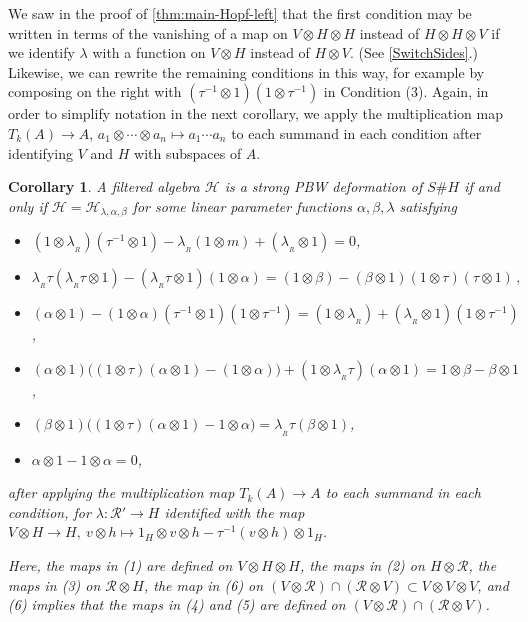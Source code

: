 \documentclass[11pt]{amsart}
\numberwithin{equation}{section}
\newtheorem{cor}[equation]{Corollary}
\newcommand{\chabl}{\cH_{\lambda,\alpha,\beta}}
\newcommand{\R}{\mathcal{R}}
\newcommand{\itau}{{\tau^{-1}}}%
\renewcommand{\_}[1]{\mbox{$_{\left( #1 \right)}$}}
\newcommand{\ot}{\otimes}
\newcommand{\Ho}{H}%
\newcommand{\cH}{\mathcal{H}}
\begin{document}
{\vspace{3ex}

We saw in the proof of \cref{thm:main-Hopf-left}
that 
  the first condition may be written in terms of the vanishing of a map on
  $V\ot H\ot H$ instead of $H\ot H\ot V$ if we identify $\lambda$
  with a function on $V\ot H$ instead of $H\ot V$.
  (See \cref{SwitchSides}.) 
  Likewise, we can rewrite the remaining
  conditions in this way, for example 
  by composing on the right with $(\itau \ot 1)(1\ot \itau)$ in
  Condition (3).  
Again, in order to simplify notation in the next corollary,
we apply the multiplication map $T_k(A)\rightarrow A$,
$a_1\ot\cdots\ot a_n\mapsto a_1\cdots  a_n$
to each summand in each condition after identifying $V$ and $H$ with
subspaces of $A$.

\vspace{1ex}

\begin{cor}    %
\label{thm:main-Hopf-right}
A filtered algebra $\cH$ is a strong PBW deformation of $S\# \Ho$ if
and only if $\cH=\chabl$ for some linear parameter functions
$\alpha,\beta,\lambda$ satisfying
\begin{itemize}
  \item[$(1)$] $(1\ot \lambda_{_R})(\itau\ot 1) - \lambda_{_R} (1\ot m) +
    (\lambda_{_R}\ot 1) = 0$,
   \item[$(2)$]
    $
  \lambda_{_R}\tau (\lambda_{_R}\tau\ot 1) 
-   (\lambda_{_R}\tau \ot 1) (1\ot \alpha)
=
(1\ot \beta)- (\beta\ot 1) (1\ot \tau)(\tau\ot 1)
\, , 
$
  \item[$(3)$] $(\alpha\ot 1) - (1\ot\alpha)(\itau\ot 1)(1\ot \itau) 
  = (1\ot\lambda_{_R})   + (\lambda_{_R}\ot 1)(1\ot \itau)$,
        \item[$(4)$] $(\alpha\ot 1)\big((1\ot\tau)(\alpha\ot 1) - (1\ot \alpha)\big) 
       + (1\ot \lambda_{_R}\tau)(\alpha\ot 1) 
     = 1\ot\beta - \beta\ot 1$,
\item[($5$)] $(\beta\ot 1)\big((1\ot\tau)(\alpha\ot 1) - 1\ot\alpha\big)
    = \lambda_{_R}\tau (\beta\ot 1)$,
    \item[(6)] $\alpha\ot 1 - 1\ot\alpha =0$,
\end{itemize}
after applying the multiplication map $T_k(A)\rightarrow A$
to each summand in each condition, for $\lambda:\R'\rightarrow H$
identified 
with the map $V\ot H\rightarrow H, 
\ v \ot h \mapsto 1_H\ot v\ot h- \itau(v\ot h)\ot 1_H$.

Here, the maps in (1) are defined on $V\ot H\ot H$,
the maps in (2) on $H\ot \R$,
the maps in (3) on $\R\ot H$,
the map in (6) on $(V\ot \R)\cap (\R\ot V)
\subset V\ot V\ot V$,
and (6) implies that the maps in (4) and (5) are defined
on $(V\ot \R)\cap (\R\ot V)$.


\end{cor}}
\end{document}

